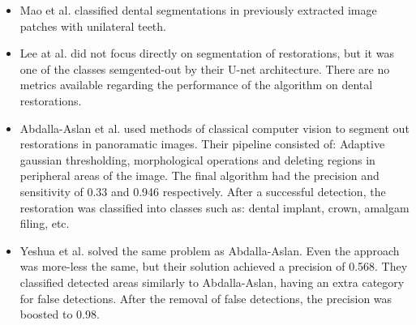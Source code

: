 \begin{itemize}
    \item{Mao et al. \cite{Mao2021}} classified dental segmentations in previously extracted image patches with unilateral teeth.
    \item{Lee at al. \cite{Lee2021}} did not focus directly on segmentation of restorations, but it was one of the classes semgented-out by their U-net architecture. There are no metrics available regarding the performance of the algorithm on dental restorations.
    \item{Abdalla-Aslan et al. \cite{AbdallaAslan2020}} used methods of classical computer vision to segment out restorations in panoramatic images. Their pipeline consisted of: Adaptive gaussian thresholding, morphological operations and deleting regions in peripheral areas of the image. The final algorithm had the precision and sensitivity of 0.33 and 0.946 respectively. After a successful detection, the restoration was classified into classes such as: dental implant, crown, amalgam filing, etc.
    \item {Yeshua et al. \cite{Yeshua2019}} solved the same problem as Abdalla-Aslan. Even the approach was more-less the same, but their solution achieved a precision of 0.568. They classified detected areas similarly to Abdalla-Aslan, having an extra category for false detections. After the removal of false detections, the precision was boosted to 0.98.
\end{itemize}